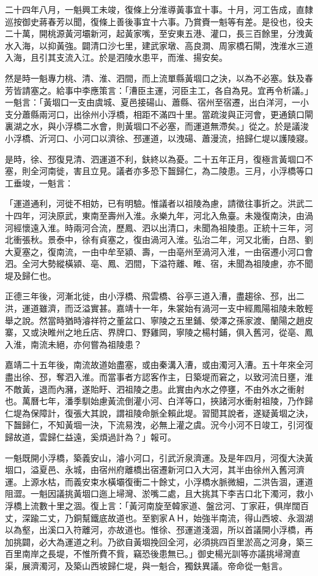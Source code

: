 二十四年八月，一魁興工未竣，復條上分淮導黃事宜十事。十月，河工告成，直隸巡按御史蔣春芳以聞，復條上善後事宜十六事。乃賞賚一魁等有差。是役也，役夫二十萬，開桃源黃河壩新河，起黃家嘴，至安東五港、灌口，長三百餘里，分洩黃水入海，以抑黃強。闢清口沙七里，建武家墩、高良澗、周家橋石閘，洩淮水三道入海，且引其支流入江。於是泗陵水患平，而淮、揚安矣。

然是時一魁專力桃、清、淮、泗間，而上流單縣黃堌口之決，以為不必塞。鈇及春芳皆請塞之。給事中李應策言：「漕臣主運，河臣主工，各自為見。宜再令析議。」一魁言：「黃堌口一支由虞城、夏邑接碭山、蕭縣、宿州至宿遷，出白洋河，一小支分蕭縣兩河口，出徐州小浮橋，相距不滿四十里。當疏浚與正河會，更通鎮口閘裏湖之水，與小浮橋二水會，則黃堌口不必塞，而運道無滯矣。」從之。於是議浚小浮橋、沂河口、小河口以濟徐、邳運道，以洩碭、蕭漫流，掊歸仁堤以護陵寢。

是時，徐、邳復見清、泗運道不利，鈇終以為憂。二十五年正月，復極言黃堌口不塞，則全河南徙，害且立見。議者亦多恐下齧歸仁，為二陵患。三月，小浮橋等口工垂竣，一魁言：

「運道通利，河徙不相妨，已有明驗。惟議者以祖陵為慮，請徵往事折之。洪武二十四年，河決原武，東南至壽州入淮。永樂九年，河北入魚臺。未幾復南決，由渦河經懷遠入淮。時兩河合流，歷鳳、泗以出清口，未聞為祖陵患。正統十三年，河北衝張秋。景泰中，徐有貞塞之，復由渦河入淮。弘治二年，河又北衝，白昂、劉大夏塞之，復南流，一由中牟至潁、壽，一由亳州至渦河入淮，一由宿遷小河口會泗。全河大勢縱橫潁、亳、鳳、泗間，下溢符離、睢、宿，未聞為祖陵慮，亦不聞堤及歸仁也。

正德三年後，河漸北徙，由小浮橋、飛雲橋、谷亭三道入漕，盡趨徐、邳，出二洪，運道雖濟，而泛溢實甚。嘉靖十一年，朱裳始有渦河一支中經鳳陽祖陵未敢輕舉之說。然當時猶時濬祥符之董盆口、寧陵之五里鋪、滎澤之孫家渡、蘭陽之趙皮寨，又或決睢州之地丘店、界牌口、野雞岡，寧陵之楊村鋪，俱入舊河，從亳、鳳入淮，南流未絕，亦何嘗為祖陵患？

嘉靖二十五年後，南流故道始盡塞，或由秦溝入漕，或由濁河入漕。五十年來全河盡出徐、邳，奪泗入淮。而當事者方認客作主，日築堤而窘之，以致河流日壅，淮不敵黃，退而內瀦，遂貽盱、泗祖陵之患。此實由內水之停壅，不由外水之衝射也。萬曆七年，潘季馴始慮黃流倒灌小河、白洋等口，挾諸河水衝射祖陵，乃作歸仁堤為保障計，復張大其說，謂祖陵命脈全賴此堤。習聞其說者，遂疑黃堌之決，下齧歸仁，不知黃堌一決，下流易洩，必無上灌之虞。況今小河不日竣工，引河復歸故道，雲歸仁益遠，奚煩過計為？」報可。

一魁既開小浮橋，築義安山，濬小河口，引武沂泉濟運。及是年四月，河復大決黃堌口，溢夏邑、永城，由宿州府離橋出宿遷新河口入大河，其半由徐州入舊河濟運。上源水枯，而義安束水橫壩復衝二十餘丈，小浮橋水脈微細，二洪告涸，運道阻澀。一魁因議挑黃堌口迤上埽灣、淤嘴二處，且大挑其下李吉口北下濁河，救小浮橋上流數十里之涸。復上言：「黃河南旋至韓家道、盤岔河、丁家莊，俱岸闊百丈，深踰二丈，乃銅幫鐵底故道也。至劉家ＡＨ，始強半南流，得山西坡、永涸湖以為壑，出溪口入符離河，亦故道也。惟徐、邳運道淺涸，所以首議開小浮橋，再加挑闢，必大為運道之利。乃欲自黃堌挽回全河，必須挑四百里淤高之河身，築三百里南岸之長堤，不惟所費不貲，竊恐後患無已。」御史楊光訓等亦議挑埽灣直渠，展濟濁河，及築山西坡歸仁堤，與一魁合，獨鈇異議。帝命從一魁言。

